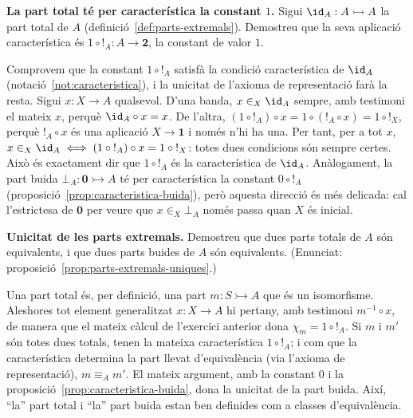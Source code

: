 \begin{exercici}
\textbf{La part total té per característica la constant \(1\).} Sigui \(\id_A:A\rightarrowtail A\) la part total de \(A\) (definició~\ref{def:parts-extremals}). Demostreu que la seva aplicació característica és \(1\circ{!}_A:A\to\mathbf2\), la constant de valor \(1\).
\end{exercici}
\begin{solucio}
Comprovem que la constant \(1\circ{!}_A\) satisfà la condició característica de \(\id_A\) (notació~\ref{not:caracteristica}), i la unicitat de l'axioma de representació farà la resta. Sigui \(x:X\to A\) qualsevol. D'una banda, \(x\in_X\id_A\) sempre, amb testimoni el mateix \(x\), perquè \(\id_A\circ x=x\). De l'altra, \((1\circ{!}_A)\circ x=1\circ({!}_A\circ x)=1\circ{!}_X\), perquè \({!}_A\circ x\) és una aplicació \(X\to\mathbf1\) i només n'hi ha una. Per tant, per a tot \(x\), \(x\in_X\id_A\iff(1\circ{!}_A)\circ x=1\circ{!}_X\): totes dues condicions són sempre certes. Això és exactament dir que \(1\circ{!}_A\) és la característica de \(\id_A\). Anàlogament, la part buida \(\bot_A:\mathbf0\rightarrowtail A\) té per característica la constant \(0\circ{!}_A\) (proposició~\ref{prop:caracteristica-buida}), però aquesta direcció és més delicada: cal l'estrictesa de \(\mathbf0\) per veure que \(x\in_X\bot_A\) només passa quan \(X\) és inicial.
\end{solucio}

\begin{exercici}
\textbf{Unicitat de les parts extremals.} Demostreu que dues parts totals de \(A\) són equivalents, i que dues parts buides de \(A\) són equivalents. (Enunciat: proposició~\ref{prop:parts-extremals-uniques}.)
\end{exercici}
\begin{solucio}
Una part total és, per definició, una part \(m:S\rightarrowtail A\) que és un isomorfisme. Aleshores tot element generalitzat \(x:X\to A\) hi pertany, amb testimoni \(m^{-1}\circ x\), de manera que el mateix càlcul de l'exercici anterior dona \(\chi_m=1\circ{!}_A\). Si \(m\) i \(m'\) són totes dues totals, tenen la mateixa característica \(1\circ{!}_A\); i com que la característica determina la part llevat d'equivalència (via l'axioma de representació), \(m\equiv_A m'\). El mateix argument, amb la constant \(0\) i la proposició~\ref{prop:caracteristica-buida}, dona la unicitat de la part buida. Així, \enquote{la} part total i \enquote{la} part buida estan ben definides com a classes d'equivalència.
\end{solucio}

